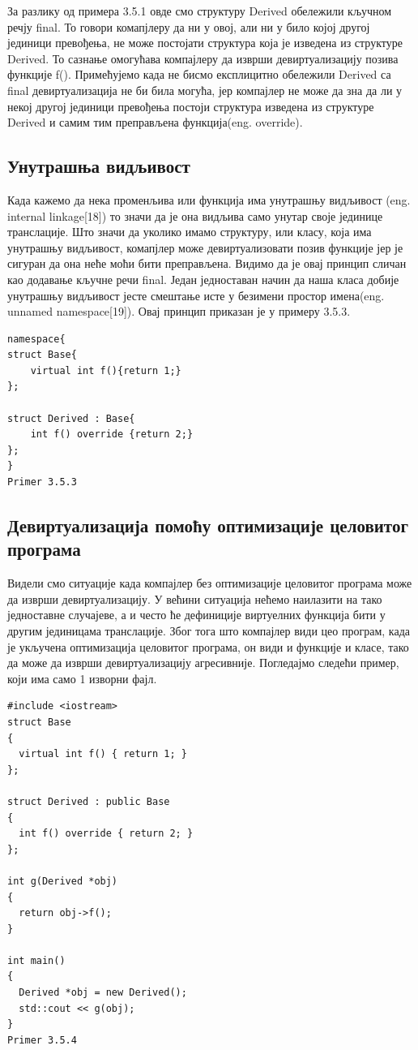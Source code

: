 \documentclass[12pt,oneside]{memoir}
\begin{document}
 За разлику од примера 3.5.1 овде смо структуру Derived обележили кључном 
 речју final.
 То говори комапјлеру да ни у овој, али ни у било којој другој јединици превођења, 
 не може постојати структура која је изведена из структуре Derived.
 То сазнање омогућава компајлеру да изврши девиртуализацију позива функције f().
 Примећујемо када не бисмо експлицитно обележили  Derived са final девиртуализација
 не би била могућа, јер компајлер не може да зна да ли у некој другој јединици превођења
 постоји структура изведена из структуре Derived и самим тим преправљена функција(eng. override).
 
 \subsection{Унутрашња видљивост}
 Када кажемо да нека променљива или функција има унутрашњу видљивост
 (eng. internal linkage[18]) то значи да је она видљива само унутар своје јединице
 транслације.
 Што значи да уколико имамо структуру, или класу, која има унутрашњу видљивост,
 комапјлер може девиртуализовати позив функције јер је сигуран да она неће моћи бити
 преправљена.
 Видимо да је овај принцип сличан као додавање кључне речи  final.
 Један једноставан начин да наша класа добије унутрашњу видљивост јесте смештање исте
 у безимени простор имена(eng. unnamed namespace[19]).
 Овај принцип приказан је у примеру 3.5.3.
 
 \begin{lstlisting}[frame=single]
namespace{
struct Base{
    virtual int f(){return 1;}
};

struct Derived : Base{
    int f() override {return 2;}
};
}
Primer 3.5.3
\end{lstlisting}
 
\subsection{Девиртуализација помоћу оптимизације целовитог програма}
 
 Видели смо ситуације када компајлер без оптимизације целовитог програма може да
 изврши девиртуализацију.
 У већини ситуација нећемо наилазити на тако једноставне случајеве, а и често ће
 дефиниције виртуелних функција бити у другим јединицама транслације.
 Због тога што компајлер види цео програм, када је укључена оптимизација
 целовитог програма, он види и функције и класе, тако да може да изврши
 девиртуализацију агресивније.
 Погледајмо следећи пример, који има само 1 изворни фајл.
 \begin{lstlisting}[frame=single]
#include <iostream>
struct Base
{
  virtual int f() { return 1; }
};

struct Derived : public Base
{
  int f() override { return 2; }
};

int g(Derived *obj)
{
  return obj->f();
}

int main()
{
  Derived *obj = new Derived();
  std::cout << g(obj);
}
Primer 3.5.4
\end{lstlisting}
	
\end{document}
